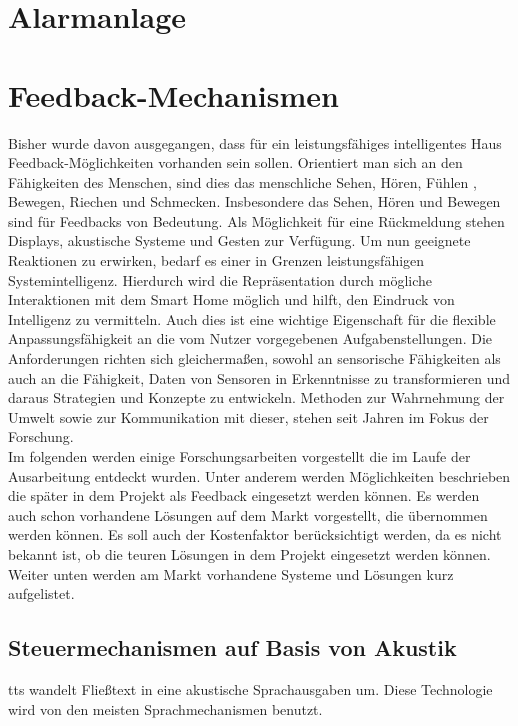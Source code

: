 \section{Alarmanlage}

\newpage
\section{Feedback-Mechanismen}
Bisher wurde davon ausgegangen, dass für ein leistungsfähiges intelligentes Haus Feedback-Möglichkeiten vorhanden sein sollen. Orientiert man sich an den Fähigkeiten des Menschen, sind dies das menschliche Sehen, Hören, Fühlen , Bewegen, Riechen und Schmecken. Insbesondere das Sehen, Hören und Bewegen sind für Feedbacks von Bedeutung. Als Möglichkeit für eine Rückmeldung stehen Displays, akustische Systeme und Gesten zur Verfügung. Um nun geeignete Reaktionen zu erwirken, bedarf es einer in Grenzen leistungsfähigen Systemintelligenz. Hierdurch wird die Repräsentation durch mögliche Interaktionen mit dem Smart Home möglich und hilft, den Eindruck von \glqq Intelligenz\grqq{} zu vermitteln. Auch dies ist eine wichtige Eigenschaft für die flexible Anpassungsfähigkeit an die vom Nutzer vorgegebenen Aufgabenstellungen. Die Anforderungen richten sich gleichermaßen, sowohl an sensorische Fähigkeiten als auch an die Fähigkeit, Daten von Sensoren in Erkenntnisse zu transformieren und daraus Strategien und Konzepte zu entwickeln. Methoden zur Wahrnehmung der Umwelt sowie zur Kommunikation mit dieser, stehen seit Jahren im Fokus der Forschung.\\
Im folgenden werden einige Forschungsarbeiten vorgestellt die im Laufe der Ausarbeitung entdeckt wurden. Unter anderem werden Möglichkeiten beschrieben die später in dem Projekt als Feedback eingesetzt werden können. Es werden auch schon vorhandene Lösungen auf dem Markt vorgestellt, die übernommen werden können. Es soll auch der Kostenfaktor berücksichtigt werden, da es nicht bekannt ist, ob die teuren Lösungen in dem Projekt eingesetzt werden können.\\
Weiter unten werden am Markt vorhandene Systeme und Lösungen kurz aufgelistet.\\

\subsection{Steuermechanismen auf Basis von Akustik}
\acrfull{tts} wandelt Fließtext in eine akustische Sprachausgaben um. Diese Technologie wird von den meisten Sprachmechanismen benutzt.

